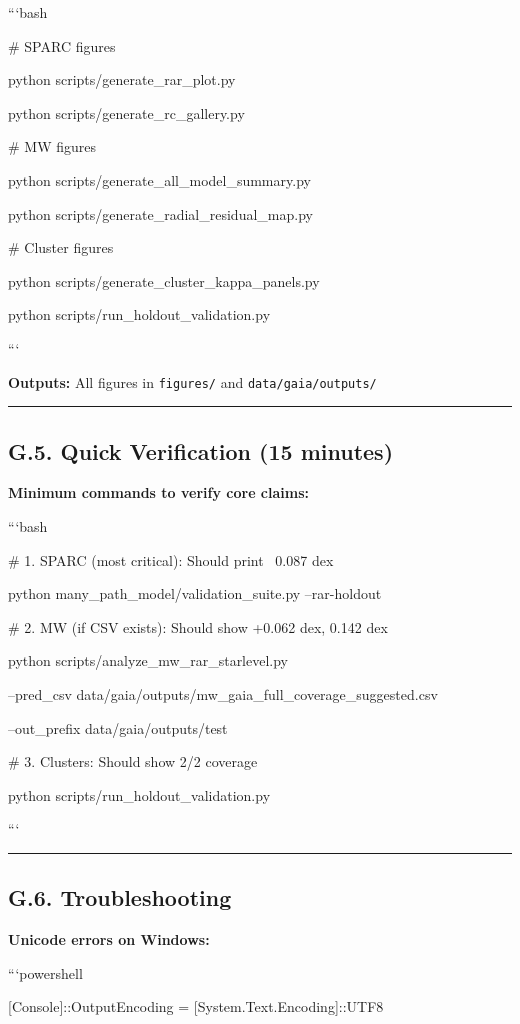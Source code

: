 \documentclass[11pt,a4paper]{article}
\begin{document}
```bash

\# SPARC figures

python scripts/generate\_rar\_plot.py

python scripts/generate\_rc\_gallery.py


\# MW figures

python scripts/generate\_all\_model\_summary.py

python scripts/generate\_radial\_residual\_map.py


\# Cluster figures

python scripts/generate\_cluster\_kappa\_panels.py

python scripts/run\_holdout\_validation.py

```


\textbf{Outputs:} All figures in \texttt{figures/} and \texttt{data/gaia/outputs/}


\medskip\hrule\medskip


\subsection{G.5. Quick Verification (15 minutes)}


\textbf{Minimum commands to verify core claims:}


```bash

\# 1. SPARC (most critical): Should print ~0.087 dex

python many\_path\_model/validation\_suite.py --rar-holdout


\# 2. MW (if CSV exists): Should show +0.062 dex, 0.142 dex  

python scripts/analyze\_mw\_rar\_starlevel.py \

  --pred\_csv data/gaia/outputs/mw\_gaia\_full\_coverage\_suggested.csv \

  --out\_prefix data/gaia/outputs/test


\# 3. Clusters: Should show 2/2 coverage

python scripts/run\_holdout\_validation.py

```


\medskip\hrule\medskip


\subsection{G.6. Troubleshooting}


\textbf{Unicode errors on Windows:}

```powershell

[Console]::OutputEncoding = [System.Text.Encoding]::UTF8
\end{document}
